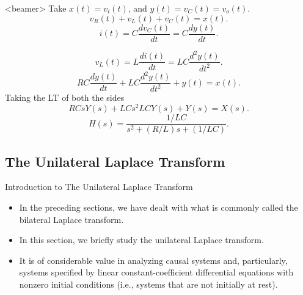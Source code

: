 \begin{frame}<beamer>
    Take $x(t) = v_i(t)$, and $y(t) = v_C(t) = v_o(t)$.
    \begin{equation*}
        v_R(t) + v_L(t) + v_C(t) = x(t).
    \end{equation*}
    \pause
    \begin{equation*}
        i(t) = C\dfrac{d v_C(t)}{dt} = C\dfrac{dy(t)}{dt}.
    \end{equation*}

    \begin{equation*}
        v_L(t) = L\dfrac{d i(t)}{dt} = LC\dfrac{d^2y(t)}{dt^2}.
    \end{equation*}
    \pause
    \begin{equation*}
        RC\dfrac{dy(t)}{dt} + LC \dfrac{d^2y(t)}{dt^2} + y(t) = x(t).
    \end{equation*}
    \pause
    Taking the LT of both the sides
    \begin{equation*}
        RCsY(s) + LC s^2LCY(s) + Y(s) = X(s).
    \end{equation*}
    \pause
     \begin{equation*}
        H(s) = \dfrac{1/LC}{s^2 + (R/L)s + (1/LC)}.
    \end{equation*}
\end{frame}


\subsection{The Unilateral Laplace Transform}

\begin{frame}{Introduction to The Unilateral Laplace Transform}
    \begin{itemize}
      \item In the preceding sections, we have dealt with what is commonly called the bilateral Laplace transform.
      \item In this section, we briefly study the unilateral Laplace transform.
      \item  It is of considerable value in analyzing causal systems and, particularly, systems specified by linear constant-coefficient differential equations with nonzero initial conditions (i.e., systems that are not initially at rest).
    \end{itemize}

\end{frame}


